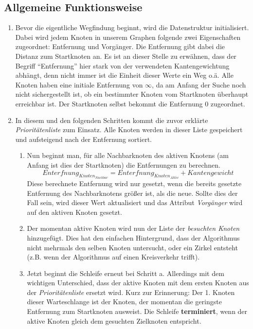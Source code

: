 \documentclass[11pt]{scrreprt}
\begin{document}
		\subsection{Allgemeine Funktionsweise}
		\begin{enumerate}
			\item Bevor die eigentliche Wegfindung beginnt, wird die Datenstruktur initialisiert.	Dabei wird jedem Knoten in unserem Graphen folgende zwei Eigenschaften zugeordnet: Entfernung und Vorgänger. Die Entfernung gibt dabei die Distanz zum Startknoten an. Es ist an dieser Stelle zu erwähnen, dass der Begriff \enquote{Entfernung} hier stark von der verwendeten Kantengewichtung abhängt, denn nicht immer ist die Einheit dieser Werte ein Weg o.ä.
			Alle Knoten haben eine initiale Entfernung von $\infty$, da am Anfang der Suche noch nicht sichergestellt ist, ob ein bestimmter Knoten vom Startknoten überhaupt erreichbar ist.
			Der Startknoten selbst bekommt die Entfernung 0 zugeordnet.
			
			\item In diesem und den folgenden Schritten kommt die zuvor erklärte \textit{Prioritätenliste} zum Einsatz. Alle Knoten werden in dieser Liste gespeichert und aufsteigend nach der Entfernung sortiert.
			
			\begin{enumerate} 
				\item Nun beginnt man, für alle Nachbarknoten des aktiven Knotens (am Anfang ist dies der Startknoten) die Entfernungen zu berechnen. 
				\begin{equation*}
					Enterfnung_{Knoten_{Nachbar}} = Enterfnung_{Knoten_{Aktiv}} + Kantengewicht
				\end{equation*}
				Diese berechnete Entfernung wird nur gesetzt, wenn die bereits gesetzte Entfernung des Nachbarknotens größer ist, als die neue. Sollte dies der Fall sein, wird dieser Wert aktualisiert und das Attribut \textit{Vorgänger} wird auf den aktiven Knoten gesetzt.
				\item Der momentan aktive Knoten wird nun der Liste der \textit{besuchten Knoten} hinzugefügt. Dies hat den einfachen Hintergrund, dass der Algorithmus nicht mehrmals den selben Knoten untersucht, oder ein Zirkel entsteht (z.B. wenn der Algorithmus auf einen Kreisverkehr trifft).
				\item Jetzt beginnt die Schleife erneut bei Schritt a. Allerdings mit dem wichtigen Unterschied, dass der aktive Knoten mit dem ersten Knoten aus der \textit{Prioritätenliste} ersetzt wird. Kurz zur Erinnerung: Der 1. Knoten dieser Warteschlange ist der Knoten, der momentan die geringste Entfernung zum Startknoten ausweist. Die Schleife \textbf{terminiert}, wenn der aktive Knoten gleich dem gesuchten Zielknoten entspricht.
			\end{enumerate}
			
		\end{enumerate}
	
\end{document}
